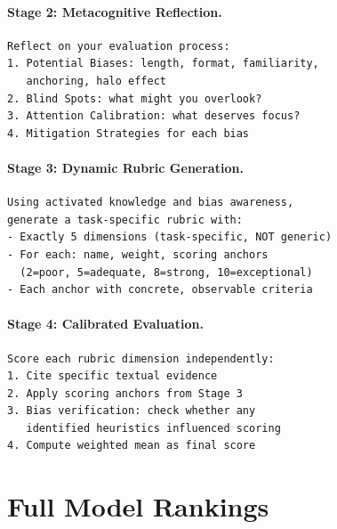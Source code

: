 \documentclass{article}
\begin{document}
\paragraph{Stage 2: Metacognitive Reflection.}
\begin{small}
\begin{verbatim}
Reflect on your evaluation process:
1. Potential Biases: length, format, familiarity,
   anchoring, halo effect
2. Blind Spots: what might you overlook?
3. Attention Calibration: what deserves focus?
4. Mitigation Strategies for each bias
\end{verbatim}
\end{small}

\paragraph{Stage 3: Dynamic Rubric Generation.}
\begin{small}
\begin{verbatim}
Using activated knowledge and bias awareness,
generate a task-specific rubric with:
- Exactly 5 dimensions (task-specific, NOT generic)
- For each: name, weight, scoring anchors
  (2=poor, 5=adequate, 8=strong, 10=exceptional)
- Each anchor with concrete, observable criteria
\end{verbatim}
\end{small}

\paragraph{Stage 4: Calibrated Evaluation.}
\begin{small}
\begin{verbatim}
Score each rubric dimension independently:
1. Cite specific textual evidence
2. Apply scoring anchors from Stage 3
3. Bias verification: check whether any
   identified heuristics influenced scoring
4. Compute weighted mean as final score
\end{verbatim}
\end{small}


\section{Full Model Rankings}
\label{app:rankings}
\end{document}
